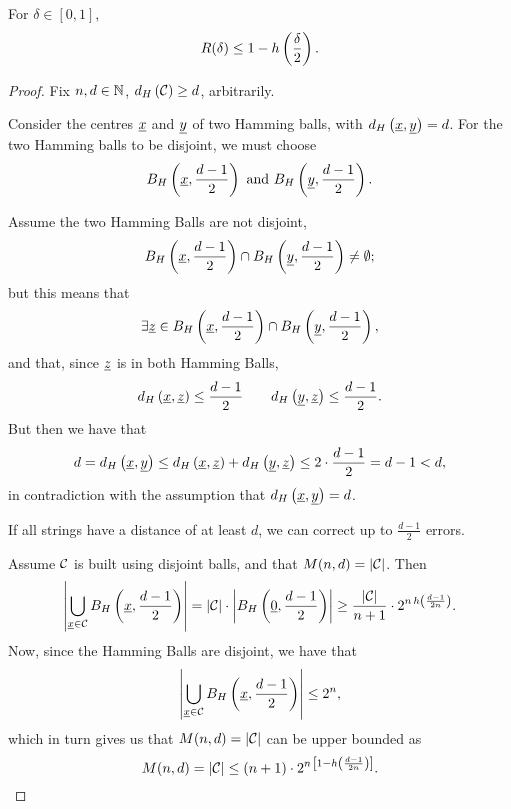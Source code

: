\begin{thm} \label{thm:hamming-bound}
	For $\delta \in [0, 1]$,
	\begin{equation*}
		R(\delta) \le 1 - h\left({\frac{\delta}{2}}\right).
	\end{equation*}
\end{thm}

\begin{proof}
	Fix $n, d \in \mathbb{N}$, $d_H \left({\mathcal{C}}\right) \ge d$, arbitrarily.

	Consider the centres $\underline{x}$ and $\underline{y}$ of two Hamming balls, with $d_H \left({\underline{x}, \underline{y}}\right) = d$.
	For the two Hamming balls to be disjoint, we must choose
	\begin{equation*}
		B_H\left(\underline{x}, \frac{d-1}{2}\right)
		\text{ and }
		B_H\left(\underline{y}, \frac{d-1}{2}\right).
	\end{equation*}

	Assume the two Hamming Balls are not disjoint, \ie
	\begin{equation*}
		B_H\left(\underline{x}, \frac{d-1}{2}\right)
		\cap
		B_H\left(\underline{y}, \frac{d-1}{2}\right)
		\neq \emptyset;
	\end{equation*}
	but this means that
	\begin{equation*}
		\exists \underline{z} \in
		B_H\left(\underline{x}, \frac{d-1}{2}\right)
		\cap
		B_H\left(\underline{y}, \frac{d-1}{2}\right),
	\end{equation*}
	and that, since $\underline{z}$ is in both Hamming Balls,
	\begin{equation*}
		d_H \left({\underline{x},\underline{z}}\right) \le \frac{d-1}{2}
		\qquad
		d_H \left({\underline{y},\underline{z}}\right) \le \frac{d-1}{2}.
	\end{equation*}
	But then we have that
	\begin{equation*}
		d = d_H \left({\underline{x},\underline{y}}\right)
		\le
		d_H \left({\underline{x},\underline{z}}\right) + d_H \left({\underline{y},\underline{z}}\right)
		\le
		2 \cdot \frac{d-1}{2}
		= d-1 < d,
	\end{equation*}
	in contradiction with the assumption that $d_H \left({\underline{x},\underline{y}}\right) = d$.

	If all strings have a distance of at least $d$, we can correct up to $\frac{d-1}{2}$ errors.

	Assume $\mathcal{C}$ is built using disjoint balls, and that $M(n, d) = \left|{\mathcal{C}}\right|$.
	Then
	\begin{equation*}
		\left|{\bigcup_{\underline{x} \in \mathcal{C}} B_H\left(\underline{x}, \frac{d-1}{2}\right)}\right|
		=
		\left|{\mathcal{C}}\right| \cdot \left|{B_H\left(\underline{0}, \frac{d-1}{2}\right)}\right|
		\ge
		\frac{\left|{\mathcal{C}}\right|}{n+1} \cdot 2^{n \, h\left({\frac{d-1}{2n}}\right)}.
	\end{equation*}
	Now, since the Hamming Balls are disjoint, we have that
	\begin{equation*}
		\left|{\bigcup_{\underline{x} \in \mathcal{C}} B_H\left(\underline{x}, \frac{d-1}{2}\right)}\right| \le 2^n,
	\end{equation*}
	which in turn gives us that $M(n,d) = \left|{\mathcal{C}}\right|$ can be upper bounded as
	\begin{equation*}
		M(n, d) = \left|{\mathcal{C}}\right| \le (n+1) \cdot 2^{n \, \left[1 - h\left({\frac{d-1}{2n}}\right)\right]}.
	\end{equation*}
	

\end{proof}
